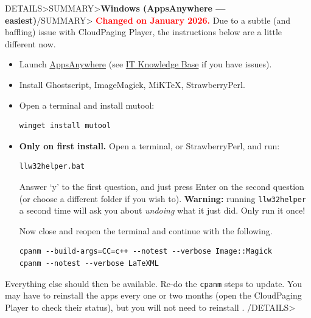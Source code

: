 \documentclass[a4paper,british]{article}
\newenvironment{foldedframe}[1][]{%
    \<DETAILS>\<SUMMARY>\textbf{#1}\</SUMMARY>}%
  {\</DETAILS>}
\newenvironment{foldedframe}[1][]{\bgroup\colorlet{TFFrameColor}{SpringGreen}
  \colorlet{TFTitleColor}{black}\begin{titled-frame}{#1}}{\end{titled-frame}\egroup}
\def\cmdinline{\lstinline[language=bash,frame=none]}
\begin{document}
\begin{foldedframe}[Windows (AppsAnywhere --- easiest)]
  \textcolor{red}{\textbf{Changed on January 2026.}} Due to a subtle (and baffling) issue with CloudPaging Player, the instructions below are a little different now.
  \begin{itemize}
    \item Launch \href{https://appsanywhere.leeds.ac.uk/}{AppsAnywhere} (see \href{https://it.leeds.ac.uk/it?id=kb_article&sysparm_article=KB0014827}{IT Knowledge Base} if you have issues).
    \item Install Ghostscript, ImageMagick, MiK\TeX{}, StrawberryPerl.
    \item Open a terminal and install mutool:
      \begin{lstlisting}
winget install mutool
      \end{lstlisting}
    \item \textbf{Only on first install.} Open a terminal, or StrawberryPerl, and run:
      \begin{lstlisting}
llw32helper.bat
      \end{lstlisting}
      Answer `y' to the first question, and just press Enter on the second question (or choose a different folder if you wish to). \textbf{Warning:} running \cmdinline|llw32helper| a second time will ask you about \emph{undoing} what it just did. Only run it once!

      Now close and reopen the terminal and continue with the following.
      \begin{lstlisting}
cpanm --build-args=CC=c++ --notest --verbose Image::Magick
cpanm --notest --verbose LaTeXML
      \end{lstlisting}
  \end{itemize}
  Everything else should then be available. Re-do the \cmdinline|cpanm| steps to update. You may have to reinstall the apps every one or two months (open the CloudPaging Player to check their status), but you will not need to reinstall \LaTeXML{}.
\end{foldedframe}
\end{document}
